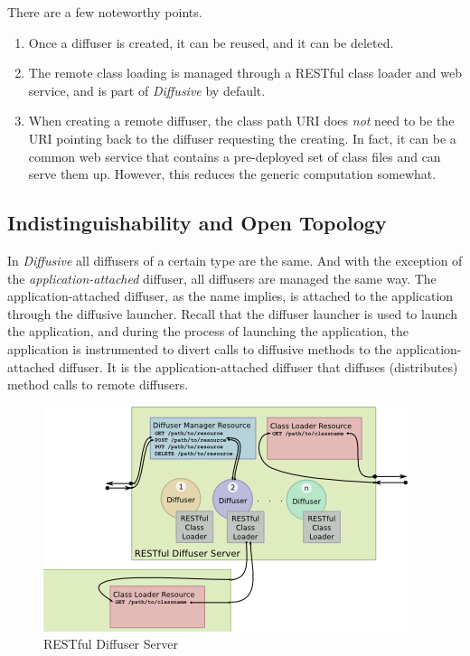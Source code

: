 \documentclass[11pt]{article}
\begin{document}
There are a few noteworthy points. 
\begin{enumerate}
\item Once a diffuser is created, it can be reused, and it can be deleted.
\item The remote class loading is managed through a RESTful class loader and web service, and is part of \emph{Diffusive} by default.
\item When creating a remote diffuser, the class path URI does \emph{not} need to be the URI pointing back to the diffuser requesting the creating. In fact, it can be a common web service that contains a pre-deployed set of class files and can serve them up. However, this reduces the generic computation somewhat.
\end{enumerate}

\subsection{Indistinguishability and Open Topology\label{sec:indistinguishability_and_open_topology}}
In \emph{Diffusive} all diffusers of a certain type are the same. And with the exception of the \emph{application-attached} diffuser, all diffusers are managed the same way. The application-attached diffuser, as the name implies, is attached to the application through the diffusive launcher. Recall that the diffuser launcher is used to launch the application, and during the process of launching the application, the application is instrumented to divert calls to diffusive methods to the application-attached diffuser. It is the application-attached diffuser that diffuses (distributes) method calls to remote diffusers.

\begin{figure}[htbp]
\begin{center}
\includegraphics[scale=1.1]{restful_diffuser_server}
\caption{RESTful Diffuser Server}
\label{fig:restful_diffuser_server}
\end{center}
\end{figure}
\end{document}
